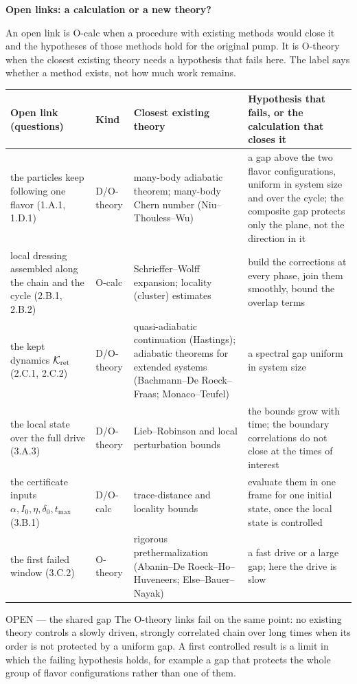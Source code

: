 \documentclass[11pt,a4paper]{article}
\newcommand{\smallheading}[1]{\par\Needspace{6\baselineskip}\medskip\textbf{#1}\par}
\begin{document}
\par{}
\smallheading{Open links: a calculation or a new theory?}
An open link is O-calc when a procedure with existing methods would close it and the hypotheses of those methods hold for the original pump. It is O-theory when the closest existing theory needs a hypothesis that fails here. The label says whether a method exists, not how much work remains.

{\small\begin{tabularx}{\textwidth}{@{}>{\raggedright\arraybackslash}p{30mm}>{\raggedright\arraybackslash}p{19mm}YY@{}}\toprule
Open link (questions)&Kind&Closest existing theory&Hypothesis that fails, or the calculation that closes it\\\midrule
the particles keep following one flavor (1.A.1, 1.D.1)&D/O-theory&many-body adiabatic theorem; many-body Chern number (Niu--Thouless--Wu)&a gap above the two flavor configurations, uniform in system size and over the cycle; the composite gap protects only the plane, not the direction in it\\
local dressing assembled along the chain and the cycle (2.B.1, 2.B.2)&O-calc&Schrieffer--Wolff expansion; locality (cluster) estimates&build the corrections at every phase, join them smoothly, bound the overlap terms\\
the kept dynamics $\mathcal K_{\rm ret}$ (2.C.1, 2.C.2)&D/O-theory&quasi-adiabatic continuation (Hastings); adiabatic theorems for extended systems (Bachmann--De Roeck--Fraas; Monaco--Teufel)&a spectral gap uniform in system size\\
the local state over the full drive (3.A.3)&D/O-theory&Lieb--Robinson and local perturbation bounds&the bounds grow with time; the boundary correlations do not close at the times of interest\\
the certificate inputs $\alpha,I_0,\eta,\delta_0,t_{\max}$ (3.B.1)&D/O-calc&trace-distance and locality bounds&evaluate them in one frame for one initial state, once the local state is controlled\\
the first failed window (3.C.2)&O-theory&rigorous prethermalization (Abanin--De Roeck--Ho--Huveneers; Else--Bauer--Nayak)&a fast drive or a large gap; here the drive is slow\\\bottomrule
\end{tabularx}}

\begin{redbox}{OPEN --- the shared gap}
The O-theory links fail on the same point: no existing theory controls a slowly driven, strongly correlated chain over long times when its order is not protected by a uniform gap. A first controlled result is a limit in which the failing hypothesis holds, for example a gap that protects the whole group of flavor configurations rather than one of them.
\end{redbox}
\end{document}

